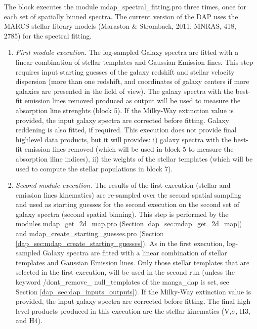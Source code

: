 \documentclass[11pt]{book}
\begin{document}
The block executes the module mdap\_spectral\_fitting.pro three times,
once for each set of spatially binned spectra.  The current version of
the DAP uses the MARCS stellar library models (Maraston \& Stromback,
2011, MNRAS, 418, 2785) for the spectral fitting.



\begin{enumerate}

\item {\it First module execution.} The log-sampled Galaxy spectra are
  fitted with a linear combination of stellar templates and Gaussian
  Emission lines. This step requires input starting guesses of the
  galaxy redshift and stellar velocity dispersion (more than one
  redshift, and coordinates of galaxy centers if more galaxies are
  presented in the field of view). The galaxy spectra with the
  best-fit emission lines removed produced as output will be used to
  measure the absorption line strenghts (block 5). If the Milky-Way
  extinction value is provided, the input galaxy spectra are corrected
  before fitting. Galaxy reddening is also fitted, if required. This
  execution does not provide final highlevel data products, but it will
  provides: i) galaxy spectra with the best-fit emission lines removed
  (which will be used in block 5 to measure the absorption iline
  indices), ii) the weights of the stellar templates (which will be
  used to compute the stellar populations in block 7).
  
\item {\it Second module execution.} The results of the first
  execution (stellar and emission lines kinematics) are re-sampled
  over the second spatial sampling and used as starting guesses for
  the second execution on the second set of galaxy spectra (second
  spatial binning). This step is performed by the modules
  mdap\_get\_2d\_map.pro (Section \ref{dap_sec:mdap_get_2d_map}) and
  mdap\_create\_starting\_guesses.pro (Section
  \ref{dap_sec:mdap_create_starting_guesses}). As in the first
  execution, log-sampled Galaxy spectra are fitted with a linear
  combination of stellar templates and Gaussian Emission lines. Only
  those stellar templates that are selected in the first execution,
  will be used in the second run (unless the keyword
  /dont\_remove\_ null\_templates of the manga\_dap is set, see
  Section \ref{dap_sec:dap_inputs_outputs}). If the Milky-Way extinction value is provided,
  the input galaxy spectra are corrected before fitting. The final
  high level products produced in this execution are the stellar
  kinematics (V,$\sigma$, H3, and H4).


\end{enumerate}
\end{document}

